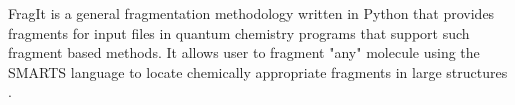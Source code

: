 FragIt is a general fragmentation methodology written in Python that provides fragments for input files in quantum chemistry programs that support such fragment based methods. It allows user to fragment "any" molecule using the SMARTS language to locate chemically appropriate fragments in large structures \cite{Steinmann_2012}.